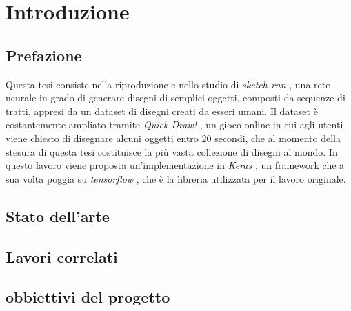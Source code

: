 \chapter{Introduzione}
\section{Prefazione}
Questa tesi consiste nella riproduzione e nello studio di \textit{sketch-rnn} \cite{sketchrnn},
una rete neurale in grado di generare disegni di semplici oggetti, composti da 
sequenze di tratti, appresi da un dataset di disegni creati da esseri umani. Il 
dataset è costantemente ampliato tramite \textit{Quick Draw!} \cite{quickdraw}, 
un gioco online in cui agli utenti viene chiesto di disegnare alcuni oggetti entro 
20 secondi, che al momento della stesura di questa tesi costituisce la più 
vasta collezione di disegni al mondo. In questo lavoro viene proposta 
un'implementazione in \textit{Keras} \cite{keras}, un framework che a sua 
volta poggia su \textit{tensorflow} \cite{tensorflow}, che è la libreria 
utilizzata per il lavoro originale.
\section{Stato dell'arte}
\section{Lavori correlati}
\section{obbiettivi del progetto}